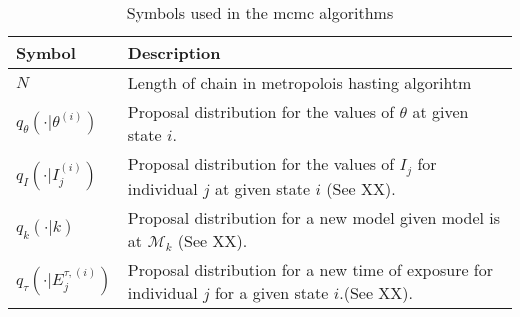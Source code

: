\begin{table}[H]
    \centering
    \begin{tabular}{| p{} | p{} |}
         \hline
        \textbf{Symbol} & \textbf{Description} \\ \hline
        $N$ & Length of chain in metropolois hasting algorihtm \\ \hline
       $ q_\theta\left(\cdot | \theta^{(i)}\right)$ & Proposal distribution for the values of $\theta$ at given state $i$. \\ \hline
       $ q_I\left(\cdot | I_j^{(i)}\right)$ & Proposal distribution for the values of $I_j$ for individual $j$ at given state $i$ (See XX). \\  \hline
       $ q_k\left(\cdot | k\right)$ & Proposal distribution for a new model given model is at $\mathcal{M}_k$ (See XX). \\  \hline
       $ q_\tau\left(\cdot | E_j^{\tau, (i)}\right)$ & Proposal distribution for a new time of exposure for individual $j$ for a given state $i$.(See XX). \\  \hline

    \end{tabular}
    \caption{Symbols used in the mcmc algorithms}
    \label{tab:mcmc_pars}
\end{table}

